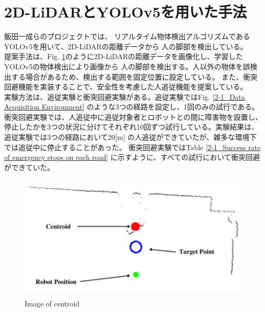 \section{2D-LiDARとYOLOv5を用いた手法}
飯田一成らのプロジェクト\cite{深層学習を用いた人追従機能の開発}では、
リアルタイム物体検出アルゴリズムであるYOLOv5を用いて、2D-LiDARの距離データから
人の脚部を検出している。\\ \indent
提案手法は、Fig. \ref{2-1_Image of centroid}のように2D-LiDARの距離データを画像化し、学習したYOLOv5の物体検出により画像から
人の脚部を検出する。人以外の物体を誤検出する場合があるため、検出する範囲を固定位置に設定している。
また、衝突回避機能を実装することで、安全性を考慮した人追従機能を提案している。\\ \indent
実験方法は、追従実験と衝突回避実験がある。追従実験ではFig. \ref{2-1_Data Acquisition Environment} のような3つの経路を設定し、1回のみの試行である。
衝突回避実験では、人追従中に追従対象者とロボットとの間に障害物を設置し、停止したかを3つの状況に分けてそれぞれ10回ずつ試行している。実験結果は、追従実験では3つの経路において20[m]
の人追従ができていたが、雑多な環境下では追従中に停止することがあった。
衝突回避実験ではTable \ref{2-1_Success rate of emergency stops on each road}
に示すように、すべての試行において衝突回避ができていた。

\begin{figure}[h]
  \begin{center}
  \includegraphics[height=60mm,clip]{figure/2-1_Image-of-centroid.png}
  \caption{Image of centroid\cite{深層学習を用いた人追従機能の開発}}
  \label{2-1_Image of centroid}
  \end{center}
\end{figure}


